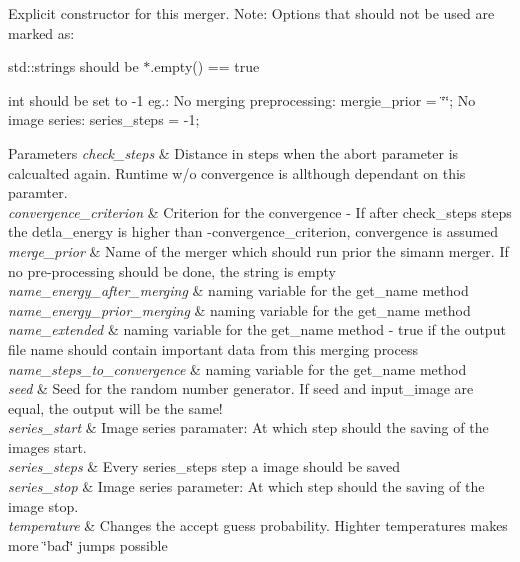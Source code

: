 Explicit constructor for this merger. Note\-: Options that should not be used are marked as\-:
\begin{DoxyItemize}
\item std\-::strings should be $\ast$.empty() == true
\item int should be set to -\/1 eg.\-: No merging preprocessing\-: mergie\-\_\-prior = \char`\"{}\char`\"{}; No image series\-: series\-\_\-steps = -\/1; 
\begin{DoxyParams}{Parameters}
{\em check\-\_\-steps} & Distance in steps when the abort parameter is calcualted again. Runtime w/o convergence is allthough dependant on this paramter. \\
\hline
{\em convergence\-\_\-criterion} & Criterion for the convergence -\/ If after check\-\_\-steps steps the detla\-\_\-energy is higher than -\/convergence\-\_\-criterion, convergence is assumed \\
\hline
{\em merge\-\_\-prior} & Name of the merger which should run prior the simann merger. If no pre-\/processing should be done, the string is empty \\
\hline
{\em name\-\_\-energy\-\_\-after\-\_\-merging} & naming variable for the get\-\_\-name method \\
\hline
{\em name\-\_\-energy\-\_\-prior\-\_\-merging} & naming variable for the get\-\_\-name method \\
\hline
{\em name\-\_\-extended} & naming variable for the get\-\_\-name method -\/ true if the output file name should contain important data from this merging process \\
\hline
{\em name\-\_\-steps\-\_\-to\-\_\-convergence} & naming variable for the get\-\_\-name method \\
\hline
{\em seed} & Seed for the random number generator. If seed and input\-\_\-image are equal, the output will be the same! \\
\hline
{\em series\-\_\-start} & Image series paramater\-: At which step should the saving of the images start. \\
\hline
{\em series\-\_\-steps} & Every series\-\_\-steps step a image should be saved \\
\hline
{\em series\-\_\-stop} & Image series parameter\-: At which step should the saving of the image stop. \\
\hline
{\em temperature} & Changes the accept guess probability. Highter temperatures makes more \char`\"{}bad\char`\"{} jumps possible \\
\hline
\end{DoxyParams}

\end{DoxyItemize}


